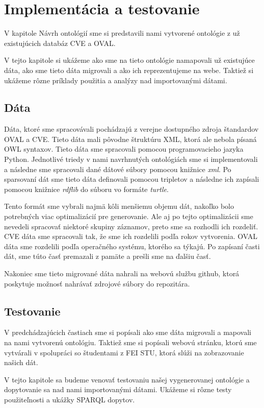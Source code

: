 \documentclass[12pt, a4paper, oneside]{book}
\begin{document}
\chapter{Implementácia a testovanie}
V kapitole Návrh ontológií sme si predstavili nami vytvorené ontológie z už existujúcich databáz CVE a OVAL.


V tejto kapitole si ukážeme ako sme na tieto ontológie namapovali už existujúce dáta, ako sme tieto dáta migrovali a ako ich reprezentujeme na webe. Taktiež si ukážeme rôzne príklady použitia a analýzy nad importovanými dátami.
\section{Dáta}
Dáta, ktoré sme spracovávali pochádzajú z verejne dostupného zdroja štandardov OVAL a CVE. Tieto dáta mali pôvodne štruktúru XML, ktorá ale nebola písaná OWL syntaxov. Tieto dáta sme spracovali pomocou programovacieho jazyka Python. Jednotlivé triedy v nami navrhnutých ontológiách sme si implementovali a následne sme spracovali dané dátové súbory pomocou knižnice \textit{xml}. Po sparsovaní dát sme tieto dáta definovali pomocou tripletov a následne ich zapísali pomocou knižnice \textit{rdflib} do súboru vo formáte \textit{turtle}. 


Tento formát sme vybrali najmä kôli menšiemu objemu dát, nakoľko bolo potrebných viac optimalizácií pre generovanie. Ale aj po tejto optimalizácii sme nevedeli spracovať niektoré skupiny záznamov, preto sme sa  rozhodli ich rozdeliť. CVE dáta sme spracovali tak, že sme ich rozdelili podľa rokov vytvorenia. OVAL dáta sme rozdelili podľa operačného systému, ktorého sa týkajú. Po zapísaní časti dát, sme túto časť premazali z pamäte a prešli sme na ďalšiu časť.


Nakoniec sme tieto migrované dáta nahrali na webovú službu github, ktorá poskytuje možnosť nahrávať zdrojové súbory do repozitára.


\section{Testovanie}
V predchádzajúcich častiach sme si popísali ako sme dáta migrovali a mapovali na nami vytvorenú ontológiu. Taktiež sme si popísali webovú stránku, ktorú sme vytvárali v spolupráci so študentami z FEI STU, ktorá slúži na zobrazovanie našich dát.


V tejto kapitole sa budeme venovať testovaniu našej vygenerovanej ontológie a dopytovanie sa nad nami importovanými dátami. Ukážeme si rôzne testy použiteľnosti a ukážky SPARQL dopytov.
\end{document}
